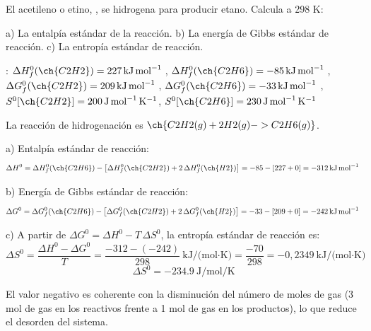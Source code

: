 \begin{exercise}
    El acetileno o etino, , se hidrogena para producir etano. Calcula a 298 K:

    a) La entalpía estándar de la reacción.
    b) La energía de Gibbs estándar de reacción.
    c) La entropía estándar de reacción.

    \datos{}: \(\Delta H^0_f (\ch{C2H2}) = \energia[kjmol]{227}\),  \(\Delta H^0_f (\ch{C2H6}) = \energia[kjmol]{-85}\), \(\Delta G^0_f (\ch{C2H2}) = \energia[kjmol]{209}\), \( \Delta G^0_f (\ch{C2H6}) = \energia[kjmol]{-33} \), \(S^0 [\ch{C2H2}] = \SI{200}{\joule\per\mole\per\kelvin}\), \(S^0 [\ch{C2H6}] = \SI{230}{\joule\per\mole\per\kelvin}\)


    \begin{solu}


        La reacción de hidrogenación es \(\ch{C2H2 (g) + 2 H2 (g) -> C2H6 (g)}\).

        a) Entalpía estándar de reacción:
        \[
            \Delta H^0 = \Delta H^0_f(\ch{C2H6}) - \left[\Delta H^0_f(\ch{C2H2}) + 2\,\Delta H^0_f(\ch{H2})\right] = -85 - \left[227+0\right] = \energia[kjmol]{-312}
        \]

        b) Energía de Gibbs estándar de reacción:
        \[
            \Delta G^0 = \Delta G^0_f(\ch{C2H6}) - \left[\Delta G^0_f(\ch{C2H2}) + 2\,\Delta G^0_f(\ch{H2})\right] = -33 - \left[209+0\right] = \energia[kjmol]{-242}
        \]

        c) A partir de \(\Delta G^0 = \Delta H^0 - T\,\Delta S^0\), la entropía estándar de reacción es:
        \[
            \Delta S^0 = \frac{\Delta H^0 - \Delta G^0}{T} = \frac{-312-(-242)}{298}\ \text{kJ/(mol·K)} = \frac{-70}{298} = -0{,}2349\ \text{kJ/(mol·K)}
        \]
        \[
            \Delta S^0 = \SI{-234,9}{\joule\per\mole\per\kelvin}
        \]

        El valor negativo es coherente con la disminución del número de moles de gas (3 mol de gas en los reactivos frente a 1 mol de gas en los productos), lo que reduce el desorden del sistema.
    \end{solu}
\end{exercise}
